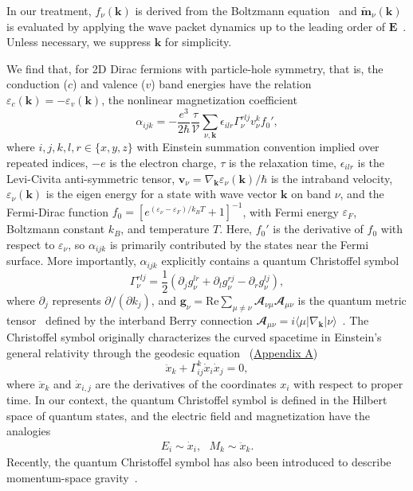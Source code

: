 \documentclass[aps,prl,twocolumn,amsmath,amssymb,showpacs, superscriptaddress,notitlepage,longbibliography,10pt]{revtex4-1}
\begin{document}
In our treatment, $f_\nu(\mathbf{k})$ is derived from the Boltzmann equation~\cite{Haug08book,Lu19nc,Lu23prb} and $\tilde{\mathbf{m}}_\nu(\mathbf{k})$ is evaluated by applying the wave packet dynamics up to the leading order of $\mathbf{E}$~\cite{GaoY14prl,GaoY15prb,GaoY19fop,XiaoC21prb}. Unless necessary, we suppress $\mathbf{k}$ for simplicity.

We find that, for 2D Dirac fermions with particle-hole symmetry, that is, the conduction ($c$) and valence ($v$) band energies have the relation $\varepsilon_c(\mathbf{k})=-\varepsilon_v(\mathbf{k})$, the nonlinear magnetization coefficient
\begin{equation}\label{Eq: alpha_CS}
\alpha_{ijk} =-\frac{e^3}{2\hbar}\frac{\tau }{\mathcal{V}}\sum_{\nu,\mathbf{k}} \epsilon_{ilr} \Gamma_\nu^{rlj}v_\nu^k  f_0',
\end{equation}
where $i,j,k,l,r\in \{x,y,z\}$ with Einstein summation convention implied over repeated indices, $-e$ is the electron charge, $\tau$ is the relaxation time, $\epsilon_{ilr}$ is the Levi-Civita anti-symmetric tensor, $\boldsymbol{v}_\nu=\nabla_\mathbf{k} \varepsilon_\nu(\mathbf{k})/\hbar$ is the intraband velocity,
$\varepsilon_\nu(\mathbf{k})$  is the eigen energy for a state with wave vector $\mathbf{k}$ on band $\nu$, and the Fermi-Dirac function $f_0=[e^{(\varepsilon_\nu-\varepsilon_F)/k_BT}+1]^{-1}$, with Fermi energy $\varepsilon_F$, Boltzmann constant $k_B$, and temperature $T$. Here, $f_0'$ is the derivative of $f_0$ with respect to $\varepsilon_\nu$, so $\alpha_{ijk}$ is primarily contributed by the states near the Fermi surface. More importantly, $\alpha_{ijk}$ explicitly contains a quantum Christoffel symbol
\begin{equation}\label{Eq: Christoffel}
\Gamma_\nu^{rlj}=\frac{1}{2}(\partial_j g_\nu^{lr}+\partial_l g_\nu^{rj}-\partial_r g_\nu^{lj}),
\end{equation}
where $\partial_j$ represents $\partial/(\partial k_j)$, and $\mathbf{g}_\nu = \text{Re} \sum_{\mu \neq \nu} \mathbfcal{A}_{\nu\mu } \mathbfcal{A}_{\mu \nu}$ is the quantum metric tensor~\cite{Provost80cmp,Resta11epjb,Torma23prl,Lu24nsr,YanBH25rppp} defined by the interband Berry connection
$\mathbfcal{A}_{\mu \nu}=i\langle \mu |\nabla_{\mathbf k}|\nu\rangle$~\cite{Berry84rspa}. The Christoffel symbol originally characterizes the curved spacetime in Einstein's general relativity through the geodesic equation~\cite{KPThorne73book,Wald10book} (\hyperlink{Appendix A}{Appendix A})
\begin{equation}
\ddot{x}_k + \Gamma^k_{ij} \dot{x}_i \dot{x}_j = 0,
\end{equation}
where $\ddot{x}_k$ and $\dot{x}_{i,j}$ are the derivatives of the coordinates $x_i$ with respect to proper time. In our context, the quantum Christoffel symbol is defined in the Hilbert space of quantum states, and the electric field and magnetization have the analogies
\begin{eqnarray}
E_i \sim \dot{x}_i, \ \ \ M_k \sim \ddot{x}_k.
\end{eqnarray}
Recently, the quantum Christoffel symbol has also been introduced to describe momentum-space gravity~\cite{Smith22prr,Mehraeen25prl,FuL26prb}.
\end{document}
